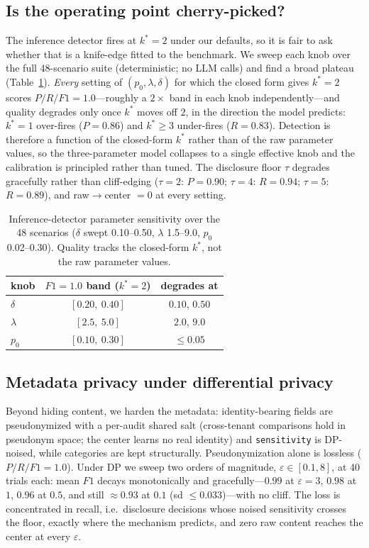 \documentclass[conference,compsoc]{IEEEtran}
\begin{document}
\subsection{Is the operating point cherry-picked?}
The inference detector fires at $k^{*}{=}2$ under our defaults, so it is fair to ask
whether that is a knife-edge fitted to the benchmark. We sweep each knob over the full
48-scenario suite (deterministic; no LLM calls) and find a broad plateau
(Table~\ref{tab:sens}). \emph{Every} setting of $(p_0,\lambda,\delta)$ for which the
closed form gives $k^{*}{=}2$ scores $P/R/F1=1.0$---roughly a $2\times$ band in each
knob independently---and quality degrades only once $k^{*}$ moves off $2$, in the
direction the model predicts: $k^{*}{=}1$ over-fires ($P{=}0.86$) and $k^{*}\ge3$
under-fires ($R{=}0.83$). Detection is therefore a function of the closed-form
$k^{*}$ rather than of the raw parameter values, so the three-parameter model
collapses to a single effective knob and the calibration is principled rather than
tuned. The disclosure floor $\tau$ degrades gracefully rather than cliff-edging
($\tau{=}2$: $P{=}0.90$; $\tau{=}4$: $R{=}0.94$; $\tau{=}5$: $R{=}0.89$), and
raw$\to$center $=0$ at every setting.

\begin{table}[t]\centering\small
\begin{tabular}{lcc}
\toprule
knob & $F1{=}1.0$ band ($k^{*}{=}2$) & degrades at \\
\midrule
$\delta$  & $[0.20,\ 0.40]$ & $0.10$, $0.50$ \\
$\lambda$ & $[2.5,\ 5.0]$   & $2.0$, $9.0$ \\
$p_0$     & $[0.10,\ 0.30]$ & $\le 0.05$ \\
\bottomrule
\end{tabular}
\caption{Inference-detector parameter sensitivity over the 48 scenarios
($\delta$ swept 0.10--0.50, $\lambda$ 1.5--9.0, $p_0$ 0.02--0.30). Quality tracks the
closed-form $k^{*}$, not the raw parameter values.}
\label{tab:sens}
\end{table}


\subsection{Metadata privacy under differential privacy}
Beyond hiding content, we harden the
metadata: identity-bearing fields are pseudonymized with a per-audit shared salt
(cross-tenant comparisons hold in pseudonym space; the center learns no real
identity) and \texttt{sensitivity} is DP-noised, while categories are kept
structurally. Pseudonymization alone is lossless ($P/R/F1=1.0$). Under DP we
sweep two orders of magnitude, $\varepsilon\in[0.1,8]$, at 40 trials each: mean
$F1$ decays monotonically and gracefully---$0.99$ at $\varepsilon{=}3$, $0.98$ at
$1$, $0.96$ at $0.5$, and still $\approx0.93$ at $0.1$ (sd $\le0.033$)---with no
cliff. The loss is concentrated in recall, i.e.\ disclosure decisions whose noised
sensitivity crosses the floor, exactly where the mechanism predicts, and zero raw
content reaches the center at every $\varepsilon$.
\end{document}
